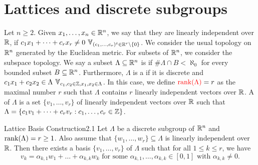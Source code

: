 \documentclass{Vorlesungstemplate_English} %
\begin{document}
 \section{Lattices and discrete subgroups}
 Let $n \geq 2$. Given $x_1, \dots, x_n \in \mathbb{R}^n$, we say that they are linearly independent over $\mathbb{R}$, if $c_1x_1 + \dots + c_rx_r \neq 0 \forall_{(c_1, \dots, c_r)^t \in \R^r \setminus \{ 0\}}$. We consider the usual topology on $\mathbb{R}^n$ generated by the Euclidean metric. For subsets of $\mathbb{R}^n$, we consider the subspace topology. We say a subset $\Lambda \subseteq \mathbb{R}^n$ is  if $\#\Lambda \cap B < \aleph_0$ for every bounded subset $B \subseteq \mathbb{R}^n$. Furthermore, $\Lambda$ is a  if it is discrete and $c_1x_1 + c_2x_2 \in \Lambda \forall_{c_1,c_2 \in \Z, x_1,x_2 \in \Lambda}$. In this case, we define ${\color{red} \text{rank}(\Lambda)} = r$ as the maximal number $r$ such that $\Lambda$ contains $r$ linearly independent vectors over $\mathbb{R}$. A  of $\Lambda$ is a set $\{ v_1, \dots, v_r\}$ of linearly independent vectors over $\mathbb{R}$ such that $\Lambda = \{ c_1v_1 + \dots + c_rv_r: c_1, \dots, c_r \in \mathbb{Z}\}$.
 \begin{lemma}{Lattice Basis Construction}{2.1}
   Let $\Lambda$ be a discrete subgroup of $\mathbb{R}^n$ and $\text{rank}(\Lambda) = r \geq 1$. Also assume that $\{ w_1, \dots, w_r\} \subseteq \Lambda$ is linearly independent over $\mathbb{R}$. Then there exists a basis $\{ v_1, \dots, v_r\}$ of $\Lambda$ such that for all $1 \leq k \leq r$, we have
   \[ v_k = \alpha_{k,1}w_1 + \dots + \alpha_{k,k}w_k \text{ for some } \alpha_{k,1}, \dots, \alpha_{k, k} \in [0,1] \text{ with } \alpha_{k,k} \neq 0.\]
 \end{lemma}
\end{document}
